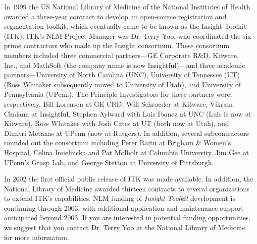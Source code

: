 
In 1999 the US National Library of Medicine of the National Institutes of
Health awarded a three-year contract to develop an open-source registration
and segmentation toolkit, which eventually came to be known as the Insight
Toolkit (ITK). ITK's NLM Project Manager was Dr. Terry Yoo, who coordinated
the six prime contractors who made up the Insight consortium. These
consortium members included three commercial partners---GE Corporate R\&D,
Kitware, Inc., and MathSoft (the company name is now Insightful)---and three
academic partners---University of North Carolina (UNC), University of
Tennessee (UT) (Ross Whitaker subsequently moved to University of Utah), and
University of Pennsylvania (UPenn). The Principle Investigators for these
partners were, respectively, Bill Lorensen at GE CRD, Will Schroeder at
Kitware, Vikram Chalana at Insightful, Stephen Aylward with Luis Ibanez at
UNC (Luis is now at Kitware), Ross Whitaker with Josh Cates at UT (both now
at Utah), and Dimitri Metaxas at UPenn (now at Rutgers). In addition, several
subcontractors rounded out the consortium including Peter Raitu at Brigham \&
Women's Hospital, Celina Imielinska and Pat Molholt at Columbia University,
Jim Gee at UPenn's Grasp Lab, and George Stetton at University of Pittsburgh.

In 2002 the first official public release of ITK was made available. In
addition, the National Library of Medicine awarded thirteen contracts to
several organizations to extend ITK's capabilities. NLM funding of 
\emph{Insight Toolkit} development is continuing through 2003, with additional
application and maintenance support anticipated beyond 2003. If you are 
interested in potential funding opportunities, we suggest that you contact
Dr. Terry Yoo at the National Library of Medicine for more information.
